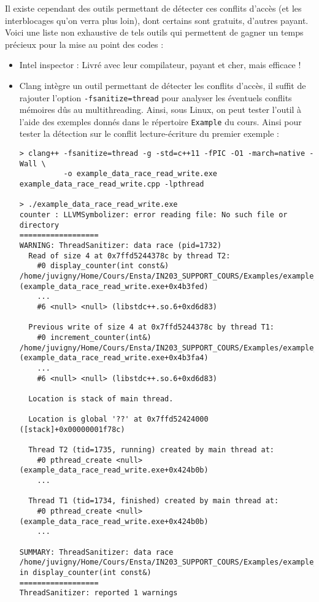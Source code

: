\documentclass[fleqn,11pt]{article}
\begin{document}
Il existe cependant des outils permettant de détecter ces conflits d'accès (et les interblocages qu'on verra plus loin), dont certains sont gratuits, d'autres payant. Voici une liste non exhaustive de tels outils
qui permettent de gagner un temps précieux pour la mise au point des codes :
\begin{itemize}
  \item Intel inspector : Livré avec leur compilateur, payant et cher, mais efficace !
  \item Clang intègre un outil permettant de détecter les conflits d'accès, il suffit de rajouter l'option
  \texttt{-fsanitize=thread} pour analyser les éventuels conflits mémoires dûs au multithreading. Ainsi, sous Linux, on peut tester l'outil à l'aide des exemples donnés dans le répertoire \texttt{Example} du cours.
  Ainsi pour tester la détection sur le conflit lecture-écriture du premier exemple :
  \begin{verbatim}
> clang++ -fsanitize=thread -g -std=c++11 -fPIC -O1 -march=native -Wall \
          -o example_data_race_read_write.exe example_data_race_read_write.cpp -lpthread

> ./example_data_race_read_write.exe
counter : LLVMSymbolizer: error reading file: No such file or directory
==================
WARNING: ThreadSanitizer: data race (pid=1732)
  Read of size 4 at 0x7ffd5244378c by thread T2:
    #0 display_counter(int const&) /home/juvigny/Home/Cours/Ensta/IN203_SUPPORT_COURS/Examples/example_data_race_read_write.cpp:16:38 (example_data_race_read_write.exe+0x4b3fed)
    ...
    #6 <null> <null> (libstdc++.so.6+0xd6d83)

  Previous write of size 4 at 0x7ffd5244378c by thread T1:
    #0 increment_counter(int&) /home/juvigny/Home/Cours/Ensta/IN203_SUPPORT_COURS/Examples/example_data_race_read_write.cpp:9:19 (example_data_race_read_write.exe+0x4b3fa4)
    ...
    #6 <null> <null> (libstdc++.so.6+0xd6d83)

  Location is stack of main thread.

  Location is global '??' at 0x7ffd52424000 ([stack]+0x00000001f78c)

  Thread T2 (tid=1735, running) created by main thread at:
    #0 pthread_create <null> (example_data_race_read_write.exe+0x424b0b)
    ...

  Thread T1 (tid=1734, finished) created by main thread at:
    #0 pthread_create <null> (example_data_race_read_write.exe+0x424b0b)
    ...

SUMMARY: ThreadSanitizer: data race /home/juvigny/Home/Cours/Ensta/IN203_SUPPORT_COURS/Examples/example_data_race_read_write.cpp:16:38 in display_counter(int const&)
==================
ThreadSanitizer: reported 1 warnings
  \end{verbatim}


\end{itemize}
\end{document}
